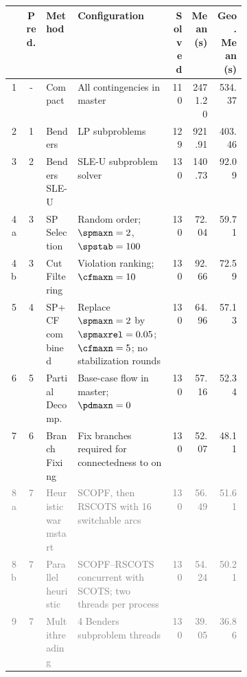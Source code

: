 \begin{tabular}{@{}rcl>{\raggedright\arraybackslash}p{0.40\linewidth}r@{\hspace{12pt}}rr@{}}
\toprule
 & Pred. & Method & Configuration & Solved & Mean (s) & Geo. Mean (s) \\
\midrule
1 & - & Compact & All contingencies in master & 110 & 2471.20 & 534.37 \\
2 & 1 & Benders & LP subproblems & 129 & 921.91 & 403.46 \\
3 & 2 & Benders SLE-U & SLE-U subproblem solver & 130 & 140.73 & 92.09 \\
4a & 3 & SP Selection & Random order; $\spmaxn=2$, $\spstab=100$ & 130 & 72.04 & 59.71 \\
4b & 3 & Cut Filtering & Violation ranking; $\cfmaxn=10$ & 130 & 92.66 & 72.59 \\
5 & 4 & SP+CF combined & Replace $\spmaxn=2$ by $\spmaxrel=0.05$; $\cfmaxn=5$; no stabilization rounds & 130 & 64.96 & 57.13 \\
6 & 5 & Partial Decomp. & Base-case flow in master; $\pdmaxn=0$ & 130 & 57.16 & 52.34 \\
7 & 6 & Branch Fixing & Fix branches required for connectedness to on & 130 & 52.07 & 48.11 \\
\textcolor{gray}{8a} & \textcolor{gray}{7} & \textcolor{gray}{Heuristic warmstart} & \textcolor{gray}{SCOPF, then RSCOTS with 16 switchable arcs} & \textcolor{gray}{130} & \textcolor{gray}{56.49} & \textcolor{gray}{51.61} \\
\textcolor{gray}{8b} & \textcolor{gray}{7} & \textcolor{gray}{Parallel heuristic} & \textcolor{gray}{SCOPF--RSCOTS concurrent with SCOTS; two threads per process} & \textcolor{gray}{130} & \textcolor{gray}{54.24} & \textcolor{gray}{50.21} \\
\textcolor{gray}{9} & \textcolor{gray}{7} & \textcolor{gray}{Multithreading} & \textcolor{gray}{4 Benders subproblem threads} & \textcolor{gray}{130} & \textcolor{gray}{39.05} & \textcolor{gray}{36.86} \\
\bottomrule
\end{tabular}
